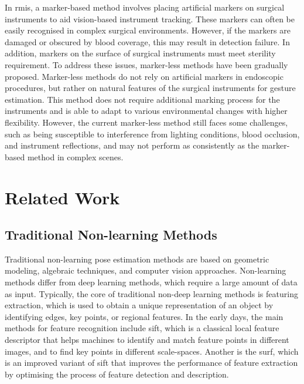 \documentclass[12pt]{article}
\begin{document}
In \gls{rmis}, a marker-based method involves placing artificial markers on surgical instruments to aid vision-based instrument tracking\cite{villani2021development}. These markers can often be easily recognised in complex surgical environments. However, if the markers are damaged or obscured by blood coverage, this may result in detection failure\cite{ma2021comprehensive}. In addition, markers on the surface of surgical instruments must meet sterility requirement\cite{xu2023graph}. To address these issues, marker-less methods have been gradually proposed\cite{reilink20133d}. Marker-less methods do not rely on artificial markers in endoscopic procedures, but rather on natural features of the surgical instruments for gesture estimation. This method does not require additional marking process for the instruments and is able to adapt to various environmental changes with higher flexibility. However, the current marker-less method still faces some challenges, such as being susceptible to interference from lighting conditions, blood occlusion, and instrument reflections, and may not perform as consistently as the marker-based method in complex scenes\cite{hein2021towards}.


\section{Related Work}
\subsection{Traditional Non-learning Methods}
Traditional non-learning pose estimation methods are based on geometric modeling, algebraic techniques, and computer vision approaches\cite{fan2024reinforcement}. Non-learning methods differ from deep learning methods, which require a large amount of data as input. Typically, the core of traditional non-deep learning methods is featuring extraction, which is used to obtain a unique representation of an object by identifying edges, key points, or regional features\cite{fan2024reinforcement}. In the early days, the main methods for feature recognition include \gls{sift}\cite{lakshmi2017image}, which is a classical local feature descriptor that helps machines to identify and match feature points in different images, and to find key points in different scale-spaces. Another is the \gls{surf}\cite{wijesinghe2010speed}, which is an improved variant of \gls{sift} that improves the performance of feature extraction by optimising the process of feature detection and description.
\end{document}
